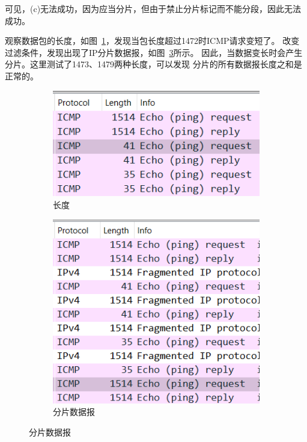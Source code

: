 \documentclass[a4paper,twoside]{article}
\begin{document}
\begin{spacing}{1.2}
可见，(c)无法成功，因为应当分片，但由于禁止分片标记而不能分段，因此无法成功。

观察数据包的长度，如图~\ref{fig:frag_len}，发现当包长度超过1472时ICMP请求变短了。
改变过滤条件，发现出现了IP分片数据报，如图~\ref{fig:frag_detail}所示。
因此，当数据变长时会产生分片。这里测试了1473、1479两种长度，可以发现
分片的所有数据报长度之和是正常的。


\begin{figure}[htb]
	\centering
	\caption{分片数据报}
	\label{fig:frag}
	\begin{subfigure}{0.4\textwidth}
		\centering
		\includegraphics[width=\textwidth]{frag_len.png}
		\caption{长度}
		\label{fig:frag_len}
	\end{subfigure}
	\begin{subfigure}{0.4\textwidth}
		\centering
		\includegraphics[width=\textwidth]{frag.png}
		\caption{分片数据报}
		\label{fig:frag_detail}
	\end{subfigure}
\end{figure}


\end{spacing}
\end{document}
